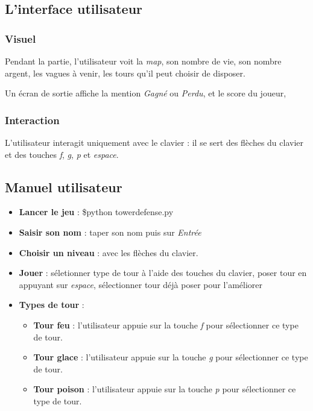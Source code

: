 \documentclass{scrartcl}
\begin{document}
	\subsection{L'interface utilisateur}
		\subsubsection{Visuel}
		Pendant la partie, l'utilisateur voit la \emph{map}, son nombre de vie, son nombre argent, les vagues à venir, les tours qu'il peut choisir de disposer.
		
		\noindent Un écran de sortie affiche la mention \emph{Gagné} ou \emph{Perdu}, et le score du joueur, 
		\subsubsection{Interaction}
		L'utilisateur interagit uniquement avec le clavier : il se sert des flèches du clavier et des touches \emph{f}, \emph{g}, \emph{p} et \emph{espace}.

	\subsection{Manuel utilisateur}
	\begin{itemize}
		\item \textbf{Lancer le jeu} : \$python towerdefense.py
		\item \textbf{Saisir son nom} : taper son nom puis sur \emph{Entrée}
		\item \textbf{Choisir un niveau} : avec les flèches du clavier.
		\item \textbf{Jouer} : séletionner type de tour à l'aide des touches du clavier, poser tour en appuyant sur \emph{espace}, sélectionner tour déjà poser pour l'améliorer
		\item \textbf{Types de tour} : 
			\begin{itemize}
				\item \textbf{Tour feu} : l'utilisateur appuie sur la touche \emph{f} pour sélectionner ce type de tour.
				\item \textbf{Tour glace} : l'utilisateur appuie sur la touche \emph{g} pour sélectionner ce type de tour.
				\item \textbf{Tour poison} : l'utilisateur appuie sur la touche \emph{p} pour sélectionner ce type de tour.
			\end{itemize}
	\end{itemize}
\end{document}
